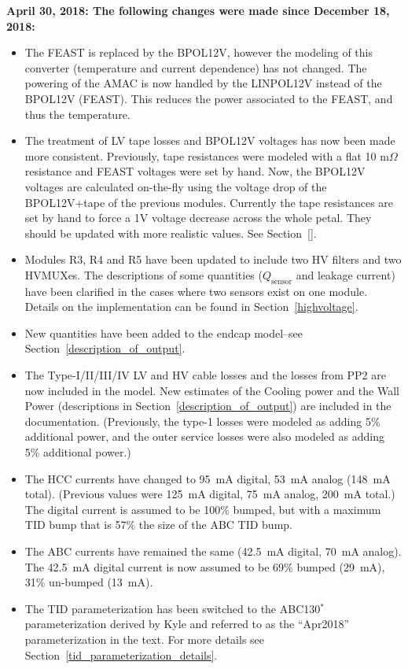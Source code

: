 \documentclass[10pt,]{article}
\begin{document}
{ \bf
April 30, 2018: The following changes were made since December 18, 2018:}
\begin{itemize}
\item The FEAST is replaced by the BPOL12V, however the modeling of this converter (temperature
  and current dependence) has not changed. The powering of the AMAC is now handled by the LINPOL12V
  instead of the BPOL12V (FEAST). This reduces the power associated to the FEAST, and thus the
  temperature.
\item The treatment of LV tape losses and BPOL12V voltages has now been made more consistent. Previously,
  tape resistances were modeled with a flat 10 m$\Omega$ resistance and FEAST voltages were set by hand.
  Now, the BPOL12V voltages are calculated on-the-fly using the voltage drop of the BPOL12V+tape of
  the previous modules. Currently the tape resistances are set by hand to force a 1V voltage decrease
  across the whole petal. They should be updated with more realistic values. See Section~\ref{}.
\item Modules R3, R4 and R5 have been updated to include two HV filters and two HVMUXes. The descriptions
  of some quantities ($Q_\text{sensor}$ and leakage current) have been clarified in the cases where two sensors
  exist on one module. Details on the implementation can be found in Section~\ref{highvoltage}.
\item New quantities have been added to the endcap model--see Section~\ref{description_of_output}.
\item The Type-I/II/III/IV LV and HV cable losses and the losses from PP2 are now included in the model. New
  estimates of the Cooling power and the Wall Power (descriptions in Section~\ref{description_of_output})
  are included in the documentation. (Previously, the type-1 losses were modeled as adding 5\% additional power,
  and the outer service losses were also modeled as adding 5\% additional power.)
\item The HCC currents have changed to 95~mA digital, 53~mA analog (148~mA total). (Previous values
  were 125~mA digital, 75~mA analog, 200~mA total.) The digital current is assumed to be 100\% bumped, but
  with a maximum TID bump that is 57\% the size of the ABC TID bump.
\item The ABC currents have remained the same (42.5~mA digital, 70~mA analog).
  The 42.5~mA digital current is now assumed to be 69\% bumped (29~mA), 31\% un-bumped (13~mA).
\item The TID parameterization has been switched to the ABC130$^{*}$ parameterization derived by Kyle
  and referred to as the ``Apr2018'' parameterization in the text. For more details see
  Section~\ref{tid_parameterization_details}.
\end{itemize}
\end{document}
